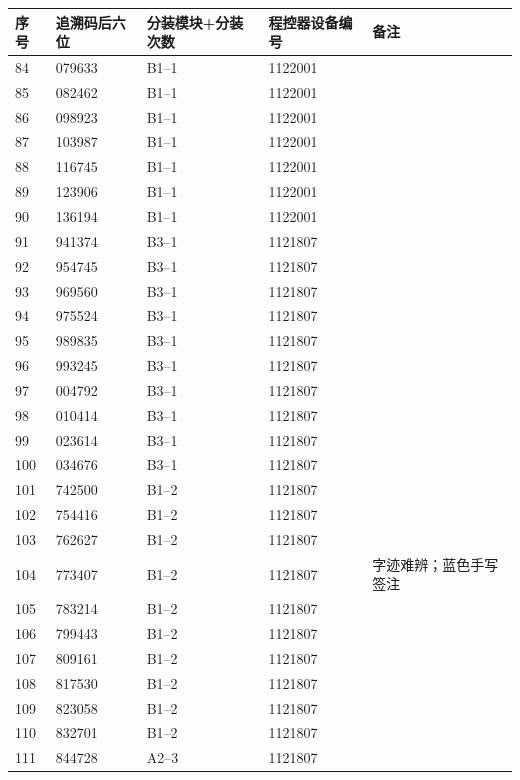 \documentclass[UTF8,10pt,a4paper,fontset=fandol]{ctexart}
\newcommand{\handwritten}[1]{#1}
\begin{document}
\small
\begin{tabular}{|p{0.65cm}|p{1.65cm}|p{3.05cm}|p{2.15cm}|p{2.85cm}|}
\hline
序号 & 追溯码后六位 & 分装模块+分装次数 & 程控器设备编号 & 备注 \\
\hline
84  & 079633 & B1--1 & 1122001 & \\
\hline
85  & 082462 & B1--1 & 1122001 & \\
\hline
86  & 098923 & B1--1 & 1122001 & \\
\hline
87  & 103987 & B1--1 & 1122001 & \\
\hline
88  & 116745 & B1--1 & 1122001 & \\
\hline
89  & 123906 & B1--1 & 1122001 & \\
\hline
90  & 136194 & B1--1 & 1122001 & \\
\hline
91  & 941374 & B3--1 & 1121807 & \\
\hline
92  & 954745 & B3--1 & 1121807 & \\
\hline
93  & 969560 & B3--1 & 1121807 & \\
\hline
94  & 975524 & B3--1 & 1121807 & \\
\hline
95  & 989835 & B3--1 & 1121807 & \\
\hline
96  & 993245 & B3--1 & 1121807 & \\
\hline
97  & 004792 & B3--1 & 1121807 & \\
\hline
98  & 010414 & B3--1 & 1121807 & \\
\hline
99  & 023614 & B3--1 & 1121807 & \\
\hline
100 & 034676 & B3--1 & 1121807 & \\
\hline
101 & 742500 & B1--2 & 1121807 & \\
\hline
102 & 754416 & B1--2 & 1121807 & \\
\hline
103 & 762627 & B1--2 & 1121807 & \\
\hline
104 & 773407 & B1--2 & 1121807 &
\handwritten{字迹难辨；蓝色手写签注}
\\
\hline
105 & 783214 & B1--2 & 1121807 & \\
\hline
106 & 799443 & B1--2 & 1121807 & \\
\hline
107 & 809161 & B1--2 & 1121807 & \\
\hline
108 & 817530 & B1--2 & 1121807 & \\
\hline
109 & 823058 & B1--2 & 1121807 & \\
\hline
110 & 832701 & B1--2 & 1121807 & \\
\hline
111 & 844728 & A2--3 & 1121807 & \\

\end{tabular}
\end{document}
